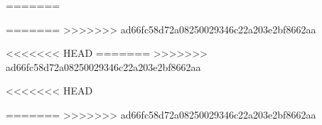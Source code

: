 \documentclass[11pt,a4paper,twoside,openright,titlepage,fleqn]{book}
\begin{document}
	\begin{onehalfspace}

=======
	\frontmatter

		
		
		
		
		
		
%		
		
		
		
			
			
		
		

=======
	\mainmatter
>>>>>>> ad66fc58d72a08250029346c22a203e2bf8662aa
		
		
		
		
		
		
		
<<<<<<< HEAD
=======
	\backmatter
>>>>>>> ad66fc58d72a08250029346c22a203e2bf8662aa
	
		\appendix
		
		

		\newpage{\pagestyle{empty}\cleardoublepage}
		\pagestyle{empty}
<<<<<<< HEAD
		\printindex
		
		
=======
		\printindex		
>>>>>>> ad66fc58d72a08250029346c22a203e2bf8662aa
		
	\end{onehalfspace}
\end{document}
